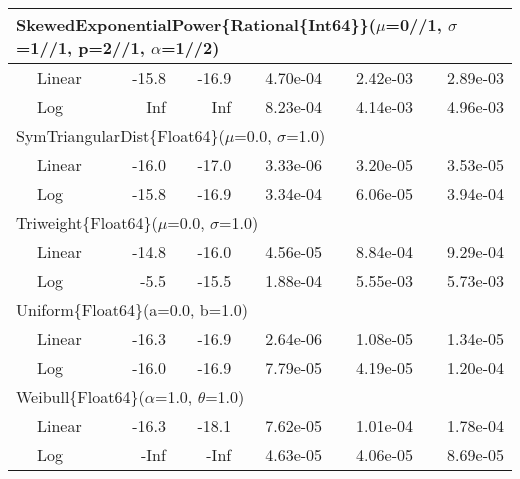 \begin{tabular}{|llrrrrr|}
\hline
\multicolumn{7}{|l|}{SkewedExponentialPower\{Rational\{Int64\}\}($\mu$=0//1, $\sigma$=1//1, p=2//1, $\alpha$=1//2)}\\ \hline
& Linear & {\color{blue}-15.8} & {\color{blue}-16.9} & {\color{blue}4.70e-04} & {\color{blue}2.42e-03} & {\color{blue}2.89e-03}\\
& Log & Inf & Inf & 8.23e-04 & 4.14e-03 & 4.96e-03\\
\hline
\multicolumn{7}{|l|}{SymTriangularDist\{Float64\}($\mu$=0.0, $\sigma$=1.0)}\\ \hline
& Linear & {\color{blue}-16.0} & {\color{blue}-17.0} & {\color{blue}3.33e-06} & {\color{blue}3.20e-05} & {\color{blue}3.53e-05}\\
& Log & -15.8 & -16.9 & 3.34e-04 & 6.06e-05 & 3.94e-04\\
\hline
\multicolumn{7}{|l|}{Triweight\{Float64\}($\mu$=0.0, $\sigma$=1.0)}\\ \hline
& Linear & {\color{blue}-14.8} & {\color{blue}-16.0} & {\color{blue}4.56e-05} & {\color{blue}8.84e-04} & {\color{blue}9.29e-04}\\
& Log & -5.5 & -15.5 & 1.88e-04 & 5.55e-03 & 5.73e-03\\
\hline
\multicolumn{7}{|l|}{Uniform\{Float64\}(a=0.0, b=1.0)}\\ \hline
& Linear & {\color{blue}-16.3} & {\color{blue}-16.9} & {\color{blue}2.64e-06} & {\color{blue}1.08e-05} & {\color{blue}1.34e-05}\\
& Log & -16.0 & -16.9 & 7.79e-05 & 4.19e-05 & 1.20e-04\\
\hline
\multicolumn{7}{|l|}{Weibull\{Float64\}($\alpha$=1.0, $\theta$=1.0)}\\ \hline
& Linear & -16.3 & -18.1 & 7.62e-05 & 1.01e-04 & 1.78e-04\\
& Log & {\color{blue}-Inf} & {\color{blue}-Inf} & {\color{blue}4.63e-05} & {\color{blue}4.06e-05} & {\color{blue}8.69e-05}\\
\hline
\end{tabular}